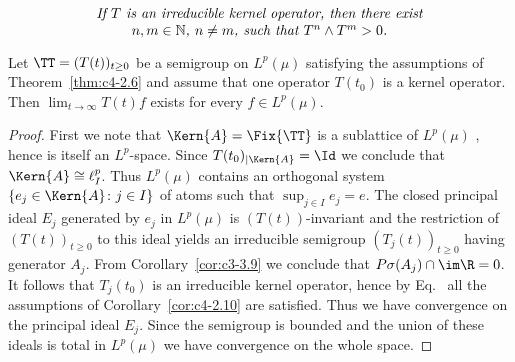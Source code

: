 \begin{equation}\label{eq:429}
\parbox{0.8\textwidth}{\centering\itshape
If $T$ is an irreducible kernel operator, then there exist 
$n,m \in \mathbb{N}$, $n \neq m$, such that $T^n \wedge T^m > 0$.}
\end{equation}
\begin{corollary}\label{cor:c4-2.11}%
%
Let $\TT = (T(t))_{t\geq 0}$ be a semigroup on $L^{p}(\mu)$ satisfying the assumptions of Theorem~\ref{thm:c4-2.6} and assume that one operator $T(t_{0})$ is a kernel operator.
Then $\lim_{t \to \infty}T(t)f$ exists for every $f \in L^{p}(\mu)$.
\end{corollary}
\begin{proof}
First we note that $\Kern{A} = \Fix{\TT}$ is a sublattice of $L^p(\mu)$ , hence is itself an $L^p$-space. 
Since $T(t_0)_{\vert \Kern{A}} = \Id$  we conclude that  $\Kern{A} \cong \ell^p_I$.   
Thus $L^p(\mu)$ contains an orthogonal system $\{e_j \in \Kern{A} \colon j \in I\}$  of atoms such that $\sup_{j \in I} e_j = e$. 
The closed principal ideal $E_j$ generated by $e_j$ in  $L^p(\mu)$ is $(T(t))$-invariant and the restriction of $(T(t))_{t \geq 0}$  to this ideal yields an irreducible semigroup $(T_j(t))_{t \geq 0}$ having generator $A_j$. 
From Corollary~\ref{cor:c3-3.9}  we conclude that  $P\sigma(A_j) \cap \im\R = {0}$.  
It follows that $T_j(t_0)$ is an irreducible kernel operator, hence by Eq.~ all the assumptions of Corollary~\ref{cor:c4-2.10} are satisfied.
Thus we have convergence on the principal ideal $E_j$.  
Since the semigroup is bounded and the union of these ideals is total in  $L^p(\mu)$  we have convergence on the whole space.
\end{proof}

